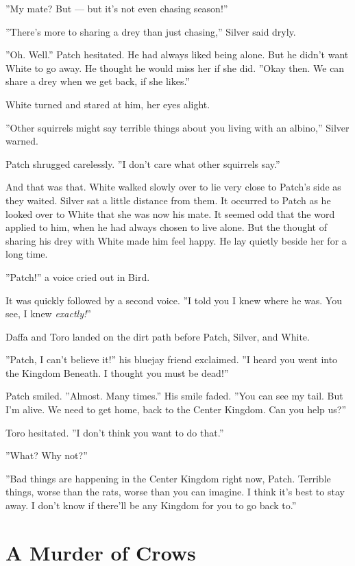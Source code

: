 \documentclass[12pt]{book}
\begin{document}
''My mate? But ---
but it's not even chasing season!''

''There's more to sharing a drey than just chasing,'' Silver said dryly.

''Oh. Well.'' Patch hesitated. He had always liked being alone. But he didn't want White to go away. He thought he would miss her if she did. ''Okay then. We can share a drey when we get back, if she likes.''

White turned and stared at him, her eyes alight.

''Other squirrels might say terrible things about you living with an albino,'' Silver warned.

Patch shrugged carelessly. ''I don't care what other squirrels say.''

And that was that. White walked slowly over to lie very close to Patch's side as they waited. Silver sat a little distance from them. It occurred to Patch as he looked over to White that she was now his mate. It seemed odd that the word applied to him, when he had always chosen to live alone. But the thought of sharing his drey with White made him feel happy. He lay quietly beside her for a long time.

''Patch!'' a voice cried out in Bird.

It was quickly followed by a second voice. ''I told you I knew where he was. You see, I knew {\it exactly!}''

Daffa and Toro landed on the dirt path before Patch, Silver, and White.

''Patch, I can't believe it!'' his bluejay friend exclaimed. ''I heard you went into the Kingdom Beneath. I thought you must be dead!''

Patch smiled. ''Almost. Many times.'' His smile faded. ''You can see my tail. But I'm alive. We need to get home, back to the Center Kingdom. Can you help us?''

Toro hesitated. ''I don't think you want to do that.''

''What? Why not?''

''Bad things are happening in the Center Kingdom right now, Patch. Terrible things, worse than the rats, worse than you can imagine. I think it's best to stay away. I don't know if there'll be any Kingdom for you to go back to.''


\section{A Murder of Crows}
\end{document}
